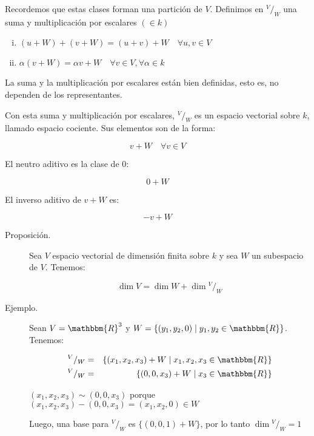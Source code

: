 \documentclass[12pt]{article}
\begin{document}
Recordemos que estas clases forman una partición de $V$. Definimos en $^V/_W$ una suma y multiplicación por escalares $(\in k)$

\begin{enumerate}[i)]
\item
\begin{math}
(u + W) + (v + W) = (u + v) + W \quad \forall u, v \in V
\end{math}
\item
\begin{math}
\alpha (v + W) = \alpha v + W \quad \forall v \in V, \forall \alpha \in k
\end{math}
\end{enumerate}

La suma y la multiplicación por escalares están bien definidas, esto es,  no dependen de los representantes.

Con esta suma y multiplicación por escalares, $^V/_W$ es un espacio vectorial sobre $k$, llamado espacio cociente. Sus elementos son de la forma:

\begin{equation}
v + W \quad \forall v \in V
\end{equation}

El neutro aditivo es la clase de $0$:

\begin{equation}
0 + W
\end{equation}

El inverso aditivo de $v + W$ es:

\begin{equation}
-v + W
\end{equation}

\begin{description}
\item [Proposición.] Sea $V$ espacio vectorial de dimensión finita sobre $k$ y  sea $W$ un subespacio de $V$. Tenemos:

\begin{equation}
\dim{V} = \dim{W} + \dim{^V/_W}
\end{equation}

\item [Ejemplo.] Sean $V = \mathbbm{R}^3$ y $W = \{ (y_1, y_2, 0) \mid y_1, y_2 \in \mathbbm{R} \}$. Tenemos:

\begin{eqnarray}
^V/_W & = & \{ (x_1, x_2, x_3) + W \mid x_1, x_2, x_3 \in \mathbbm{R} \} \nonumber \\
^V/_W & = & \{ (0, 0, x_3) + W \mid x_3 \in \mathbbm{R} \} \nonumber
\end{eqnarray}

$(x_1, x_2, x_3) \sim (0, 0, x_3)$ porque $(x_1, x_2, x_3) - (0, 0, x_3) = (x_1, x_2, 0) \in W$

Luego, una base para $^V/_W$ es $\{ (0, 0, 1) + W \}$, por lo tanto $\dim{^V/_W} = 1$
\end{description}
\end{document}
